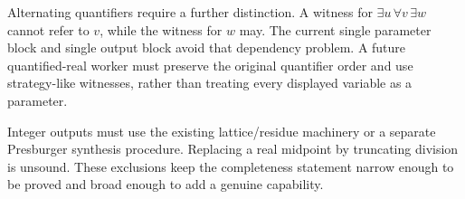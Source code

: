 Alternating quantifiers require a further distinction. A witness for \(\exists u\,\forall v\,\exists w\) cannot refer to \(v\), while the witness for \(w\) may. The current single parameter block and single output block avoid that dependency problem. A future quantified-real worker must preserve the original quantifier order and use strategy-like witnesses, rather than treating every displayed variable as a parameter.

Integer outputs must use the existing lattice/residue machinery or a separate Presburger synthesis procedure. Replacing a real midpoint by truncating division is unsound. These exclusions keep the completeness statement narrow enough to be proved and broad enough to add a genuine capability.

